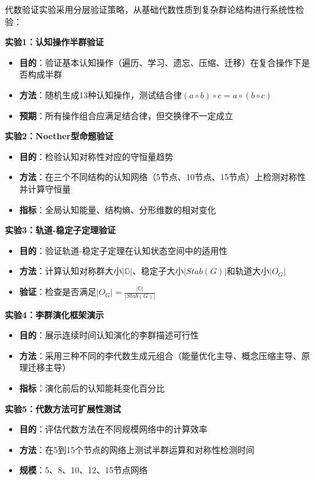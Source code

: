 \documentclass[12pt,a4paper]{article}
\newcommand{\cognitivegroup}{\mathbb{G}}
\begin{document}
代数验证实验采用分层验证策略，从基础代数性质到复杂群论结构进行系统性检验：

\textbf{实验1：认知操作半群验证}
\begin{itemize}
    \item \textbf{目的}：验证基本认知操作（遍历、学习、遗忘、压缩、迁移）在复合操作下是否构成半群
    \item \textbf{方法}：随机生成13种认知操作，测试结合律$(a \circ b) \circ c = a \circ (b \circ c)$
    \item \textbf{预期}：所有操作组合应满足结合律，但交换律不一定成立
\end{itemize}

\textbf{实验2：Noether型命题验证}
\begin{itemize}
    \item \textbf{目的}：检验认知对称性对应的守恒量趋势
    \item \textbf{方法}：在三个不同结构的认知网络（5节点、10节点、15节点）上检测对称性并计算守恒量
    \item \textbf{指标}：全局认知能量、结构熵、分形维数的相对变化
\end{itemize}

\textbf{实验3：轨道-稳定子定理验证}
\begin{itemize}
    \item \textbf{目的}：验证轨道-稳定子定理在认知状态空间中的适用性
    \item \textbf{方法}：计算认知对称群大小$|\cognitivegroup|$、稳定子大小$|Stab(G)|$和轨道大小$|O_G|$
    \item \textbf{验证}：检查是否满足$|O_G| = \frac{|\cognitivegroup|}{|Stab(G)|}$
\end{itemize}

\textbf{实验4：李群演化框架演示}
\begin{itemize}
    \item \textbf{目的}：展示连续时间认知演化的李群描述可行性
    \item \textbf{方法}：采用三种不同的李代数生成元组合（能量优化主导、概念压缩主导、原理迁移主导）
    \item \textbf{指标}：演化前后的认知能耗变化百分比
\end{itemize}

\textbf{实验5：代数方法可扩展性测试}
\begin{itemize}
    \item \textbf{目的}：评估代数方法在不同规模网络中的计算效率
    \item \textbf{方法}：在5到15个节点的网络上测试半群运算和对称性检测时间
    \item \textbf{规模}：5、8、10、12、15节点网络
\end{itemize}
\end{document}
